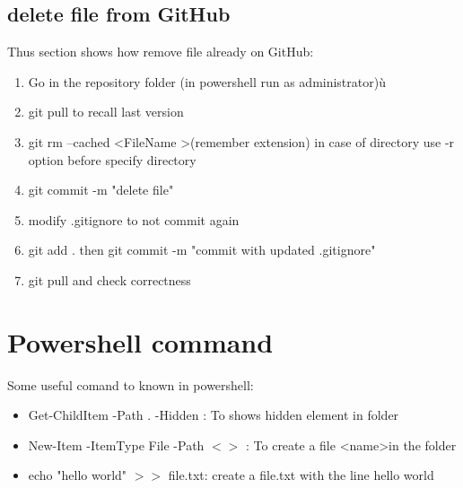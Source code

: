 \documentclass{report}
\begin{document}
\subsection{delete file from GitHub}
Thus section shows how remove file already on GitHub:
\begin{enumerate}
    \item Go in the repository folder (in powershell run as administrator)ù
    \item git pull to recall last version
    \item git rm --cached \textless FileName \textgreater (remember extension) in case of directory use -r option before specify directory 
    \item git commit -m "delete file"
    \item modify .gitignore to not commit again 
    \item git add . then git commit -m "commit with updated .gitignore"
    \item git pull and check correctness  
\end{enumerate}

\section{Powershell command} 
Some useful comand to known in powershell: 
\begin{itemize}
    \item Get-ChildItem -Path . -Hidden : To shows hidden element in folder
    \item New-Item -ItemType File -Path $<>$ : To create a file \textless name\textgreater in the folder
    \item echo "hello world" $>>$ file.txt: create a file.txt with the line hello world   
\end{itemize}
\end{document}
